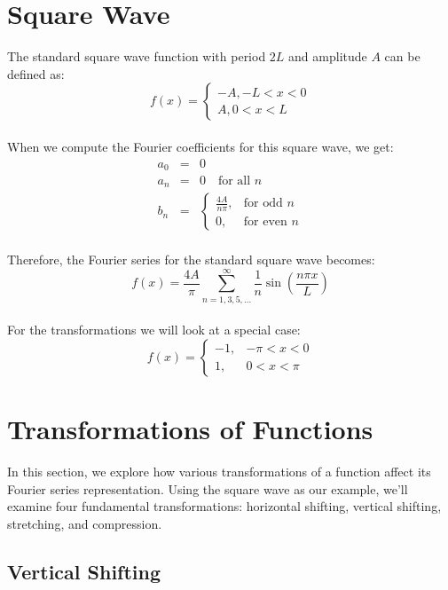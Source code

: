 \documentclass{article}
\begin{document}
\section{Square Wave}
The standard square wave function with period $2L$ and amplitude $A$ can be defined as:
\begin{equation}
    f(x) = 
\begin{cases} 
-A,     -L < x < 0 \\
A,      0 < x < L
\end{cases}
    \end{equation}\\
When we compute the Fourier coefficients for this square wave, we get:
\begin{eqnarray}
a_0 &=& 0 \\
a_n &=& 0 \quad \text{for all } n\\
b_n &=& 
\begin{cases} 
\frac{4A}{n\pi}, & \text{for odd } n \\
0, & \text{for even } n
\end{cases}
\end{eqnarray}\\
Therefore, the Fourier series for the standard square wave becomes:
\begin{equation}
    f(x) = \frac{4A}{\pi} \sum_{n=1,3,5,...}^{\infty} \frac{1}{n} \sin\left(\frac{n\pi x}{L}\right)
    \end{equation}\\
For the transformations we will look at a special case:
\begin{equation}
f(x) = 
\begin{cases} 
-1, & -\pi < x < 0 \\
1, & 0 < x < \pi
\end{cases}
\end{equation}

\section{Transformations of Functions}

In this section, we explore how various transformations of a function affect its Fourier series representation. Using the square wave as our example, we'll examine four fundamental transformations: horizontal shifting, vertical shifting, stretching, and compression.

\subsection{Vertical Shifting}
    
\end{document}
